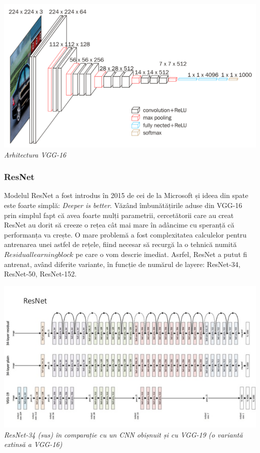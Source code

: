 \begin{center}
\includegraphics[scale=1]{vgg16} \\
\textit{Arhitectura VGG-16}
\end{center}

\subsubsection{ResNet}
Modelul ResNet a fost introdus în 2015 de cei de la Microsoft și ideea din spate este foarte simplă: \textit{Deeper is better}. Văzând îmbunătățirile aduse din VGG-16 prin simplul fapt că avea foarte mulți parametrii, cercetătorii care au creat ResNet au dorit să creeze o rețea cât mai mare în adâncime cu speranță că performanța va crește. O mare problemă a fost complexitatea calculelor pentru antrenarea unei astfel de rețele, fiind necesar să recurgă la o tehnică numită $Residual learning block$ pe care o vom descrie imediat. Asrfel, ResNet a putut fi antrenat, având diferite variante, în funcție de numărul de layere: ResNet-34, ResNet-50, ResNet-152.

\begin{center}
\includegraphics[scale=0.5]{resnet} \\
\textit{ResNet-34 (sus) în comparație cu un CNN obișnuit și cu VGG-19 (o variantă extinsă a VGG-16)}
\end{center}

